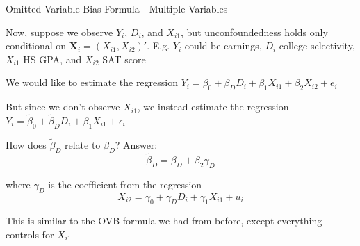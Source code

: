 \documentclass[11pt,english,handout]{beamer}
\newenvironment{wideitemize}{\itemize\addtolength{\itemsep}{10pt}}{\enditemize}
\begin{document}
\begin{frame}{Omitted Variable Bias Formula - Multiple Variables}
	\begin{wideitemize}
	
	\item
	Now, suppose we observe $Y_i$, $D_i$, and $X_{i1}$, but unconfoundedness holds only conditional on $\bm{X}_i = (X_{i1}, X_{i2})'$. \pause E.g. $Y_i$ could be earnings, $D_i$ college selectivity, $X_{i1}$ HS GPA, and $X_{i2}$ SAT score
		
	\pause	
	\item We would like to estimate the regression $Y_i = \beta_0 + \beta_{D} D_i + \beta_{1} X_{i1} + \beta_{2} X_{i2}+e_i$
	
	\pause
	\item
	But since we don't observe $X_{i1}$, we instead estimate the regression $Y_i = \tilde\beta_0 + \tilde\beta_D D_i + \tilde\beta_1 X_{i1} + \epsilon_i$
	
	\pause
	\item
	How does $\tilde\beta_D$ relate to $\beta_D$? \pause Answer: $$\tilde\beta_D= \beta_D+ \beta_2 \gamma_D$$ 
	
	\noindent where $\gamma_D$ is the coefficient from the regression $$X_{i2} = \gamma_0 + \gamma_D D_i + \gamma_1 X_{i1} + u_i$$ 

	\item This is similar to the OVB formula we had from before, except everything controls for $X_{i1}$
\end{wideitemize}
	
\end{frame}
\end{document}
